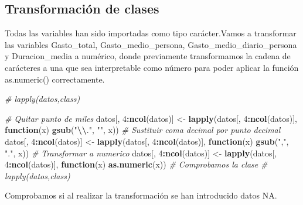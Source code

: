 \documentclass[data,article,submit,moreauthors,pdftex]{Definitions/mdpi}
\newenvironment{Shaded}{\begin{snugshade}}{\end{snugshade}}
\newcommand{\CommentTok}[1]{\textcolor[rgb]{0.56,0.35,0.01}{\textit{#1}}}
\newcommand{\ControlFlowTok}[1]{\textcolor[rgb]{0.13,0.29,0.53}{\textbf{#1}}}
\newcommand{\DecValTok}[1]{\textcolor[rgb]{0.00,0.00,0.81}{#1}}
\newcommand{\FunctionTok}[1]{\textcolor[rgb]{0.13,0.29,0.53}{\textbf{#1}}}
\newcommand{\NormalTok}[1]{#1}
\newcommand{\OtherTok}[1]{\textcolor[rgb]{0.56,0.35,0.01}{#1}}
\newcommand{\SpecialCharTok}[1]{\textcolor[rgb]{0.81,0.36,0.00}{\textbf{#1}}}
\newcommand{\StringTok}[1]{\textcolor[rgb]{0.31,0.60,0.02}{#1}}
\begin{document}
\hypertarget{transformaciuxf3n-de-clases}{%
\subsection{Transformación de
clases}\label{transformaciuxf3n-de-clases}}

Todas las variables han sido importadas como tipo carácter.Vamos a
transformar las variables Gasto\_total, Gasto\_medio\_persona,
Gasto\_medio\_diario\_persona y Duracion\_media a numérico, donde
previamente transformamos la cadena de carácteres a una que sea
interpretable como número para poder aplicar la función as.numeric()
correctamente.

\begin{Shaded}
\begin{Highlighting}[]
\CommentTok{\# lapply(datos,class)}
\end{Highlighting}
\end{Shaded}

\begin{Shaded}
\begin{Highlighting}[]
\CommentTok{\# Quitar punto de miles}
\NormalTok{datos[, }\DecValTok{4}\SpecialCharTok{:}\FunctionTok{ncol}\NormalTok{(datos)] }\OtherTok{\textless{}{-}} \FunctionTok{lapply}\NormalTok{(datos[, }\DecValTok{4}\SpecialCharTok{:}\FunctionTok{ncol}\NormalTok{(datos)], }\ControlFlowTok{function}\NormalTok{(x) }\FunctionTok{gsub}\NormalTok{(}\StringTok{"}\SpecialCharTok{\textbackslash{}\textbackslash{}}\StringTok{."}\NormalTok{, }\StringTok{""}\NormalTok{, x))}
\CommentTok{\# Sustituir coma decimal por punto decimal}
\NormalTok{datos[, }\DecValTok{4}\SpecialCharTok{:}\FunctionTok{ncol}\NormalTok{(datos)] }\OtherTok{\textless{}{-}} \FunctionTok{lapply}\NormalTok{(datos[, }\DecValTok{4}\SpecialCharTok{:}\FunctionTok{ncol}\NormalTok{(datos)], }\ControlFlowTok{function}\NormalTok{(x) }\FunctionTok{gsub}\NormalTok{(}\StringTok{","}\NormalTok{, }\StringTok{"."}\NormalTok{, x))}
\CommentTok{\# Transformar a numerico}
\NormalTok{datos[, }\DecValTok{4}\SpecialCharTok{:}\FunctionTok{ncol}\NormalTok{(datos)] }\OtherTok{\textless{}{-}} \FunctionTok{lapply}\NormalTok{(datos[, }\DecValTok{4}\SpecialCharTok{:}\FunctionTok{ncol}\NormalTok{(datos)], }\ControlFlowTok{function}\NormalTok{(x) }\FunctionTok{as.numeric}\NormalTok{(x))}
\CommentTok{\# Comprobamos la clase}
\CommentTok{\# lapply(datos,class)}
\end{Highlighting}
\end{Shaded}

Comprobamos si al realizar la transformación se han introducido datos
NA.
\end{document}
